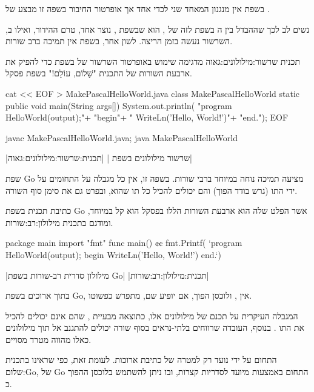 בשפת  אין מנגנון המאחד שני  לכדי  אחד אך אופרטור
החיבור בשפה זו מבצע  של .

נשים לב לכך שההבדל בין ה בשפת  לזה של , הוא שבשפת ,
נוצר  אחד, טרם ההידור, ואילו ב, השרשור נעשה בזמן הריצה. לשון
אחר, בשפת  אין תמיכה ב רב שורות.

 תכנית שרשור:מילולונים:גאוה מדגימה שימוש באופרטור השרשור של  בשפת
 כדי להפיק את ארבעת השורות של התכנית "שָׁלוֹם, עוֹלָם!" בשפת פסקל.

\bash
cat << EOF > MakePascalHelloWorld.java
class MakePascalHelloWorld {
  static public void main(String args[]) {
    System.out.println(
    "program HelloWorld(output);\n"+
    "begin\n"+
    " WriteLn('Hello, World!')\n"+
    "end.\n"); }}
EOF
\END
\begin{תכנית}
\setLTR

\begin{Output}
\bash
javac MakePascalHelloWorld.java; java MakePascalHelloWorld
\END
\end{Output}\setRTL
{}|שרשור מילולונים בשפת |
|תכנית:שרשור:מילולונים:גאוה|
\end{תכנית}

שפת Go מציעה תמיכה נוחה במיוחד ב רבי שורות. בשפה זו, אין כל מגבלה על
 התחומים על ידי התו  (גרש בודד הפוך) והם יכולים להכיל
כל תו שהוא, ובפרט גם את סימן סוף השורה.

כתיבת תכנית בשפת Go אשר הפלט שלה הוא ארבעת השורות הללו בפסקל הוא קל במיוחד,
ומודגם ב תכנית מילולון:רב:שורות.
\begin{תכנית}
\setLTR
\begin{GOn}
  package main
  import "fmt"
  func main() {¢¢
    fmt.Printf(
    `program HelloWorld(output);
    begin
    WriteLn('Hello, World!')
    end.`)
  }
\end{GOn}\setRTL
{}|מילולון סדרית רב-שורות בשפת Go|
|תכנית:מילולון:רב:שורות|
\end{תכנית}

בתוך  ארוכים בשפת Go, אין
, ולוכסן הפוך, אם יופיע שם, מתפרש כפשוטו.

המגבלה העיקרית על תכנם של מילולונים אלו, כתוצאה מבעיית
, שהם אינם יכולים להכיל את התו . בנוסף,
העובדה שרווחים בלתי-נראים בסוף שורה יכולים להתגנב אל תוך מילולונים כאלו
מהווה מטרד מסויים.

 התחום על ידי  נועד רק למטרה של כתיבת  ארוכות. לעומת
זאת, כפי שראינו ב תכנית שלום:Go,  של Go התחום באמצעות  מיועד
לסדריות קצרות, ובו ניתן להשתמש בלוכסן ההפוך כ.

